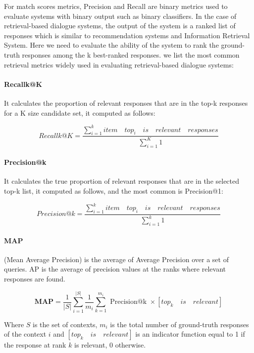 \documentclass{article}
\begin{document}
For match scores metrics, Precision and Recall are binary metrics used to evaluate systems with binary output such as binary classifiers. In the case of retrieval-based dialogue systems, the output of the system is a ranked list of responses which is similar to recommendation systems and Information Retrieval System. Here we need to evaluate the ability of the system to rank the ground-truth responses among the k best-ranked responses. we list the most common retrieval metrics widely used in evaluating retrieval-based dialogue systems: 

\paragraph{Recallk@K} It calculates the proportion of relevant responses that are in the top-k responses for a K size candidate set, it computed as follows:

\begin{equation}
    Recallk@K = \frac{\sum_{i=1}^{k} item \quad top_i\quad is \quad relevant \quad  responses}{\sum_{i=1}^{K} 1}
\end{equation}

\paragraph{Precision@k} It calculates the true proportion of relevant responses that are in the selected top-k list, it computed as follows, and the most common is Precision@1:

\begin{equation}
    Precision@k = \frac{\sum_{i=1}^{k} item \quad top_i\quad is \quad relevant \quad  responses}{\sum_{i=1}^{k} 1}
\end{equation}

\paragraph{MAP} (Mean Average Precision) is the average of Average Precision over a set of queries. AP is the average of precision values at the ranks where relevant responses are found.


\begin{equation}
\mathbf{MAP}=\frac{1}{|S|} \sum_{i=1}^{|S|} \frac{1}{m_{i}} \sum_{k=1}^{m_{i}} \text { Precision@k } \times [top_k\quad is \quad relevant] 
\end{equation}

Where $S$ is the set of contexts, $m_i$ is the total number of ground-truth responses of the context $i$ and $[top_k\quad is \quad relevant]$ is an indicator function equal to 1 if the response at rank $k$ is relevant, 0 otherwise.
\end{document}
